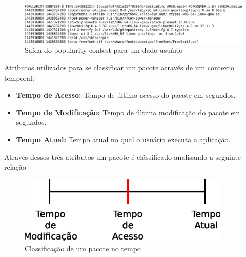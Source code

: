 \begin{frame}
\begin{figure}[h!]
    \centering
    \includegraphics[width=1\textwidth]{figura/popularity_contest.eps}
    \caption{Saída do popularity-contest para um dado usuário}
\end{figure}
\end{frame}


\begin{frame}

    Atributos utilizados para se classificar um pacote através
    de um contexto temporal:

    \begin{itemize}
        \item \textbf{Tempo de Acesso:} Tempo de último acesso do pacote
        em segundos.

        \item \textbf{Tempo de Modificação:} Tempo de última modificação
        do pacote em segundos.

        \item \textbf{Tempo Atual:} Tempo atual no qual o usuário executa
        a aplicação.
    \end{itemize}

\end{frame}


\begin{frame}

    Através desses três atributos um pacote é clássificado analisando
a seguinte relação

    \begin{figure}[h]
      \centering
      \includegraphics[width=0.9\textwidth]{figura/barra_temporal_01.eps}
      \caption{Classificação de um pacote no tempo}
      \label{fig:barra_temporal}
    \end{figure}

\end{frame}


